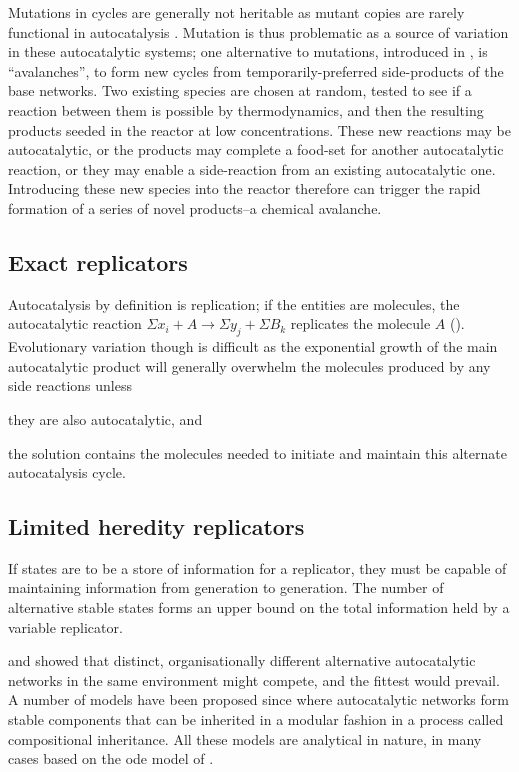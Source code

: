 Mutations in cycles are generally not heritable as mutant copies are rarely functional in autocatalysis \parencite{Vasas2012a}. Mutation is thus problematic as a source of variation in these autocatalytic systems; one alternative to mutations, introduced in \textcite{Fernando:2007pf},  is ``avalanches'', to form new cycles from temporarily-preferred side-products of the base networks. Two existing species are chosen at random, tested to see if a reaction between them is possible by thermodynamics, and then the resulting products seeded in the reactor at low concentrations. These new reactions may be autocatalytic, or the products may complete a food-set for another autocatalytic reaction, or they may enable a side-reaction from an existing autocatalytic one. Introducing these new species into the reactor therefore can trigger the rapid formation of a series of novel products--a chemical avalanche.

\subsection{Exact replicators}\label{non-informational-exact-replicators}

Autocatalysis by definition is replication; if the entities are molecules, the autocatalytic reaction $\Sigma x_i + A\rightarrow \Sigma y_j + \Sigma B_k$ replicates the molecule $A$ (\eg \textcite{Lifson1997}). Evolutionary variation though is difficult as the exponential growth of the main autocatalytic product will generally overwhelm the molecules produced by any side reactions unless \begin{inparaenum}\item they are also autocatalytic, and \item the solution contains the molecules needed to initiate and maintain this alternate autocatalysis cycle.\end{inparaenum}

\subsection{Limited heredity replicators}\label{variable-replicators}

If states are to be a store of information for a replicator, they must be capable of maintaining information from generation to generation. The number of alternative stable states forms an upper bound on the total information held by a variable replicator.

\Textcite{Ganti:2003hl} and  \textcite{Eigen1971} showed that distinct, organisationally different alternative autocatalytic networks in the same environment might compete, and the fittest would prevail. A number of models have been proposed since where autocatalytic networks form stable components that can be inherited in a modular fashion in a process called compositional inheritance. All these models are analytical in nature, in many cases based on the \gls{ode} model of \cite{Farmer1986}.

